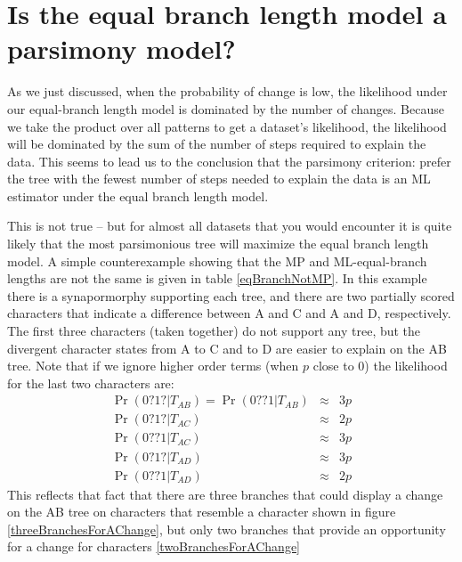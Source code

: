 \documentclass[11pt]{article}
\begin{document}
\section*{Is the equal branch length model a parsimony model?}
As we just discussed, when the probability of change is low, the likelihood under our
equal-branch length model is dominated by the number of changes.
Because we take the product over all patterns to get a dataset's likelihood,
the likelihood will be dominated by the sum of the number of steps required
to explain the data.
This seems to lead us to the conclusion that the parsimony criterion: prefer the tree
with the fewest number of steps needed to explain the data is an ML estimator under the
equal branch length model.

This is not true -- but for almost all datasets that you would encounter it is quite likely
that the most parsimonious tree will maximize the equal branch length model.
A simple counterexample showing that the MP and ML-equal-branch lengths are not the
same is given in table \ref{eqBranchNotMP}.
In this example there is a synapormorphy supporting each tree, and there are two partially scored 
characters that indicate a difference between A and C and A and D, respectively.
The first three characters (taken together) do not support any tree, but the divergent character states
from A to C and to D are easier to explain on the AB tree.
Note that if we ignore higher order terms (when $p$ close to 0) the likelihood for the last two characters are:
\begin{eqnarray}
	\Pr(0?1?|T_{AB})	= \Pr(0??1|T_{AB}) & \approx &  3p \\
	\Pr(0?1?|T_{AC})	& \approx & 2p \\
    \Pr(0??1|T_{AC}) & \approx & 3p \\
	\Pr(0?1?|T_{AD})	& \approx & 3p \\
	\Pr(0??1|T_{AD}) & \approx & 2p 
\end{eqnarray}
This reflects that fact that there are three branches that could display a change on the AB tree on characters
that resemble a character shown in figure \ref{threeBranchesForAChange},
but only two branches that provide an opportunity for a change for characters \ref{twoBranchesForAChange}
\end{document}
